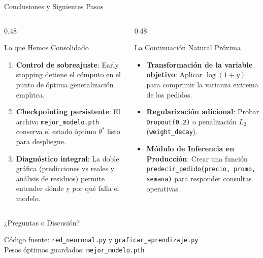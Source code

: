 \documentclass[10pt,aspectratio=169]{beamer}
\begin{document}
\begin{frame}{Conclusiones y Siguientes Pasos}
  \begin{columns}[T]
    \begin{column}{0.48\textwidth}
      \begin{block}{Lo que Hemos Consolidado}
        \scriptsize
        \begin{enumerate}
          \item \textbf{Control de sobreajuste}: Early stopping detiene el cómputo en el punto de óptima generalización empírica.
          \item \textbf{Checkpointing persistente}: El archivo \texttt{mejor\_modelo.pth} conserva el estado óptimo $\theta^*$ listo para despliegue.
          \item \textbf{Diagnóstico integral}: La doble gráfica (predicciones vs reales y análisis de residuos) permite entender dónde y por qué falla el modelo.
        \end{enumerate}
      \end{block}
    \end{column}

    \begin{column}{0.48\textwidth}
      \begin{alertblock}{La Continuación Natural Próxima}
        \scriptsize
        \begin{itemize}
          \item \textbf{Transformación de la variable objetivo}: Aplicar $\log(1 + y)$ para comprimir la varianza extrema de los pedidos.
          \item \textbf{Regularización adicional}: Probar \texttt{Dropout(0.2)} o penalización $L_2$ (\texttt{weight\_decay}).
          \item \textbf{Módulo de Inferencia en Producción}: Crear una función \texttt{predecir\_pedido(precio, promo, semana)} para responder consultas operativas.
        \end{itemize}
      \end{alertblock}
    \end{column}
  \end{columns}
\end{frame}

\begin{frame}[standout]
  \Huge ¿Preguntas o Discusión?
  \vspace{0.4cm}

  \normalsize Código fuente: \texttt{red\_neuronal.py} y \texttt{graficar\_aprendizaje.py} \\
  Pesos óptimos guardados: \texttt{mejor\_modelo.pth}
\end{frame}
\end{document}
